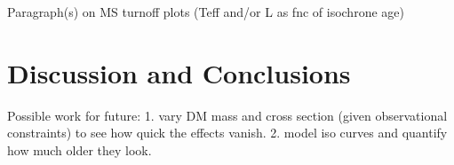 \documentclass[useAMS,usenatbib]{mnras}
\begin{document}
Paragraph(s) on MS turnoff plots (Teff and/or L as fnc of isochrone age)


\section{Discussion and Conclusions}
\label{sec:discus}

  Possible work for future: 1. vary DM mass and cross section (given observational constraints) to see how quick the effects vanish. 2. model iso curves and quantify how much older they look.








\end{document}

